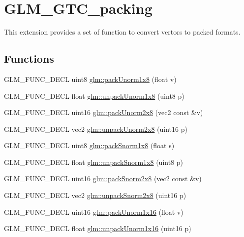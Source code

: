 \hypertarget{group__gtc__packing}{}\section{G\+L\+M\+\_\+\+G\+T\+C\+\_\+packing}
\label{group__gtc__packing}


This extension provides a set of function to convert vertors to packed formats.  


\subsection*{Functions}
\begin{DoxyCompactItemize}
\item 
G\+L\+M\+\_\+\+F\+U\+N\+C\+\_\+\+D\+E\+CL uint8 \hyperlink{group__gtc__packing_ga2f9963e5d762b10085b280d3662017ba}{glm\+::pack\+Unorm1x8} (float v)
\item 
G\+L\+M\+\_\+\+F\+U\+N\+C\+\_\+\+D\+E\+CL float \hyperlink{group__gtc__packing_ga32f3f2642df2ea87449d59fb614a8305}{glm\+::unpack\+Unorm1x8} (uint8 p)
\item 
G\+L\+M\+\_\+\+F\+U\+N\+C\+\_\+\+D\+E\+CL uint16 \hyperlink{group__gtc__packing_ga833288fc0d4a79f19d0db75a6843bfe6}{glm\+::pack\+Unorm2x8} (vec2 const \&v)
\item 
G\+L\+M\+\_\+\+F\+U\+N\+C\+\_\+\+D\+E\+CL vec2 \hyperlink{group__gtc__packing_ga96ce0c24339ee676e28a027fffd1edf6}{glm\+::unpack\+Unorm2x8} (uint16 p)
\item 
G\+L\+M\+\_\+\+F\+U\+N\+C\+\_\+\+D\+E\+CL uint8 \hyperlink{group__gtc__packing_ga26b6cd7a35c46c4b6a342f3b97b47423}{glm\+::pack\+Snorm1x8} (float s)
\item 
G\+L\+M\+\_\+\+F\+U\+N\+C\+\_\+\+D\+E\+CL float \hyperlink{group__gtc__packing_ga6f2bebf536fbf7c8b97d4b306bb3354e}{glm\+::unpack\+Snorm1x8} (uint8 p)
\item 
G\+L\+M\+\_\+\+F\+U\+N\+C\+\_\+\+D\+E\+CL uint16 \hyperlink{group__gtc__packing_ga05d08a82923166ec7cd5d0e6154c9953}{glm\+::pack\+Snorm2x8} (vec2 const \&v)
\item 
G\+L\+M\+\_\+\+F\+U\+N\+C\+\_\+\+D\+E\+CL vec2 \hyperlink{group__gtc__packing_ga27f30f0281b88e152b0895f5e2ead878}{glm\+::unpack\+Snorm2x8} (uint16 p)
\item 
G\+L\+M\+\_\+\+F\+U\+N\+C\+\_\+\+D\+E\+CL uint16 \hyperlink{group__gtc__packing_ga60c7d915f5653559ae02c2f79a8c5c1d}{glm\+::pack\+Unorm1x16} (float v)
\item 
G\+L\+M\+\_\+\+F\+U\+N\+C\+\_\+\+D\+E\+CL float \hyperlink{group__gtc__packing_ga7770e3ade4f4764cc1b2eb42ac4ec188}{glm\+::unpack\+Unorm1x16} (uint16 p)

\end{DoxyCompactItemize}
